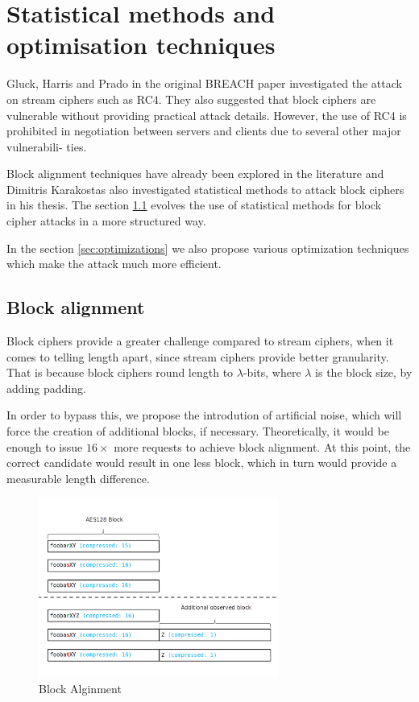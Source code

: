 \chapter{Statistical methods and optimisation techniques}\label{statistic_methods}

Gluck, Harris and Prado in the original BREACH paper investigated the attack on
stream ciphers such as RC4. They also suggested that block ciphers are vulnerable
without providing practical attack details. However, the use of RC4 is prohibited in
negotiation between servers and clients \cite{rc4_prohibit} due to several other major vulnerabili-
ties. 

Block alignment techniques have already been explored in the literature \cite{poodle} and 
Dimitris Karakostas also investigated statistical methods
to attack block ciphers in his thesis.
The section \ref{sec:blockalign} evolves the use of statistical
methods for block cipher attacks in a more structured way.

In the section \ref{sec:optimizations} we also propose various optimization techniques which
make the attack much more efficient.

\section{Block alignment}\label{sec:blockalign}

Block ciphers provide a greater challenge compared to stream ciphers, when it
comes to telling length apart, since stream ciphers provide better granularity. That
is because block ciphers round length to $\lambda$-bits, where $\lambda$ is the block size,
by adding padding.

In order to bypass this, we propose the introdution of artificial noise, 
which will force the creation of additional blocks, if necessary. 
Theoretically, it would be enough to issue $16\times$ more requests
to achieve block alignment. At this point, the correct candidate would result in one less
block, which in turn would provide a measurable length difference. 


\begin{figure}[H] \caption{Block Alginment} \centering
\includegraphics[width=0.7\textwidth]{diagrams/block_alignment.png}\end{figure}

